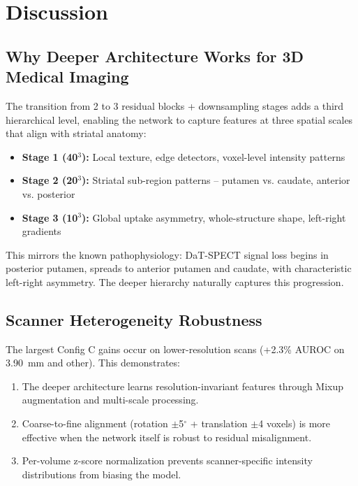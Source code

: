 \section{Discussion}
\label{sec:discussion}

\subsection{Why Deeper Architecture Works for 3D Medical Imaging}
\label{sec:why_deeper}

The transition from 2 to 3 residual blocks + downsampling stages adds a third hierarchical level, enabling the network to capture features at three spatial scales that align with striatal anatomy:
\begin{itemize}
    \item \textbf{Stage 1 (40$^3$):} Local texture, edge detectors, voxel-level intensity patterns
    \item \textbf{Stage 2 (20$^3$):} Striatal sub-region patterns -- putamen vs. caudate, anterior vs. posterior
    \item \textbf{Stage 3 (10$^3$):} Global uptake asymmetry, whole-structure shape, left-right gradients
\end{itemize}

This mirrors the known pathophysiology: DaT-SPECT signal loss begins in posterior putamen, spreads to anterior putamen and caudate, with characteristic left-right asymmetry. The deeper hierarchy naturally captures this progression.

\subsection{Scanner Heterogeneity Robustness}
\label{sec:scanner_robustness}

The largest Config C gains occur on lower-resolution scans (+2.3\% AUROC on 3.90~mm and other). This demonstrates:
\begin{enumerate}
    \item The deeper architecture learns resolution-invariant features through Mixup augmentation and multi-scale processing.
    \item Coarse-to-fine alignment (rotation $\pm$5$^\circ$ + translation $\pm$4 voxels) is more effective when the network itself is robust to residual misalignment.
    \item Per-volume z-score normalization prevents scanner-specific intensity distributions from biasing the model.
\end{enumerate}

